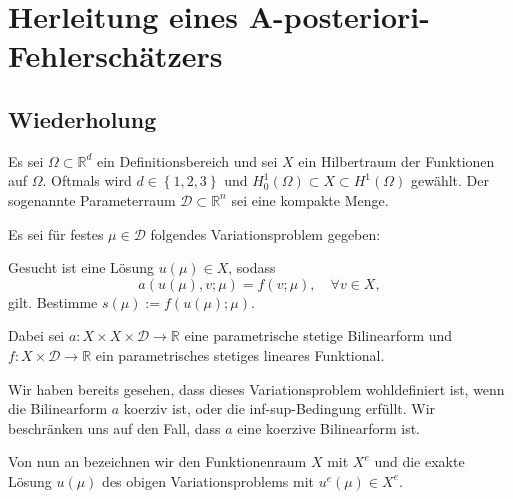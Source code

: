 
\section{Herleitung eines A-posteriori-Fehlerschätzers} %
\label{sec:herleitung}


\subsection{Wiederholung} %
\label{sub:wiederholung}

Es sei $\Omega \subset \mathbb{R}^d$ ein Definitionsbereich und sei $X$ ein Hilbertraum der Funktionen auf $\Omega$.
Oftmals wird $d \in \left\{ 1, 2, 3 \right\}$ und  $H^1_0(\Omega) \subset X \subset H^1(\Omega)$ gewählt.
Der sogenannte Parameterraum $\mathcal D \subset \mathbb{R}^n$ sei eine kompakte Menge.

Es sei für festes $\mu \in \mathcal D$ folgendes Variationsproblem gegeben:
\begin{addmargin}[2em]{2em}
    Gesucht ist eine Lösung $u(\mu) \in X$, sodass
    \begin{equation}
        a(u(\mu), v; \mu) = f(v; \mu), \quad \forall v \in X,
    \end{equation}
    gilt.
    Bestimme $s(\mu) := f(u(\mu); \mu)$.
\end{addmargin}
Dabei sei $a \colon X \times X \times \mathcal D \to \mathbb{R}$ eine parametrische stetige Bilinearform und $f \colon X \times \mathcal D \to \mathbb{R}$ ein parametrisches stetiges lineares Funktional.

Wir haben bereits gesehen, dass dieses Variationsproblem wohldefiniert ist, wenn die Bilinearform $a$ koerziv ist, oder die inf-sup-Bedingung erfüllt.
Wir beschränken uns auf den Fall, dass $a$ eine koerzive Bilinearform ist.

Von nun an bezeichnen wir den Funktionenraum $X$ mit $X^e$ und die exakte Lösung $u(\mu)$ des obigen Variationsproblems mit $u^e(\mu) \in X^e$.

